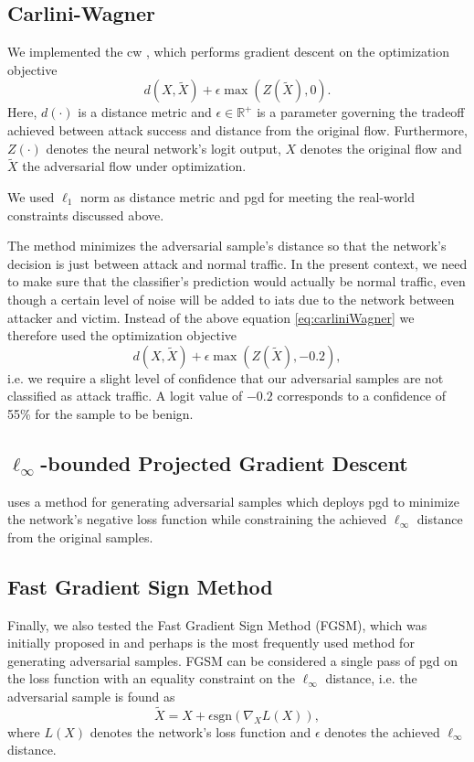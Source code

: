 \documentclass[conference]{IEEEtran}
\begin{document}
\subsection{Carlini-Wagner}
We implemented the \gls{cw} \cite{carlini_towards_2017}, which performs gradient descent on the optimization objective
\begin{equation} \label{eq:carliniWagner}
d(X,\tilde X) + \epsilon  \max(Z(\tilde X), 0).
\end{equation}
Here, $d(\cdot)$ is a distance metric and $\epsilon \in \mathbb R^+$ is a parameter governing the tradeoff achieved between attack success and distance from the original flow. Furthermore, $Z(\cdot)$ denotes the neural network's logit output, $X$ denotes the original flow and $\tilde X$ the adversarial flow under optimization.

We used $\ell_1$ norm as distance metric and \gls{pgd} for meeting the real-world constraints discussed above.

The method minimizes the adversarial sample's distance so that the network's decision is just between attack and normal traffic. In the present context, we need to make sure that the classifier's prediction would actually be normal traffic, even though a certain level of noise will be added to \glspl{iat} due to the network between attacker and victim. Instead of the above equation \ref{eq:carliniWagner} we therefore used the optimization objective
\begin{equation}
d(X,\tilde X) + \epsilon  \max(Z(\tilde X), -0.2),
\end{equation}
i.e. we require a slight level of confidence that our adversarial samples are not classified as attack traffic. A logit value of $-0.2$ corresponds to a confidence of 55\% for the sample to be benign.

\subsection{$\ell_\infty$-bounded Projected Gradient Descent}
\cite{madry_towards_2018} uses a method for generating adversarial samples which deploys \gls{pgd}  to minimize the network's negative loss function while constraining the achieved $\ell_\infty$ distance from the original samples.

\subsection{Fast Gradient Sign Method}
Finally, we also tested the Fast Gradient Sign Method (FGSM), which was initially proposed in \cite{goodfellow_explaining_2015} and perhaps is the most frequently used method for generating adversarial samples. FGSM can be considered a single pass of \gls{pgd} on the loss function with an equality constraint on the $\ell_\infty$ distance, i.e. the adversarial sample is found as
\begin{equation}
\tilde X = X + \epsilon \text{sgn}( \nabla_X L(X)),
\end{equation}
where $L(X)$ denotes the network's loss function and $\epsilon$ denotes the achieved $\ell_\infty$ distance.
\end{document}
